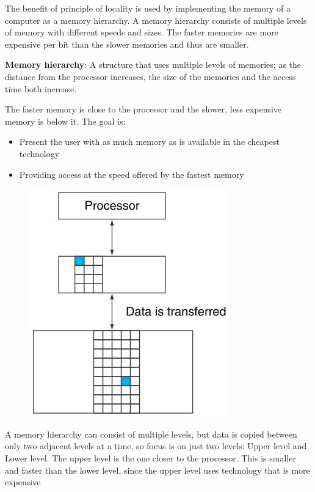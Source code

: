 \documentclass[10pt,a4paper]{article}
\begin{document}
The benefit of principle of locality is used by implementing the memory of a computer as a memory
hierarchy. A memory hierarchy consists of multiple levels of memory with different speeds and sizes.
The faster memories are more expensive per bit than the slower memories and thus are smaller.

\begin{tcolorbox}[breakable,colback=white]
\textbf{Memory hierarchy}: A structure that uses multiple levels of memories; as the distance from
the processor increases, the size of the memories and the access time both increase.
\end{tcolorbox}

The faster memory is close to the processor and the slower, less expensive memory is below it. The
goal is:
\begin{itemize}
    \item Present the user with as much memory as is available in the cheapest technology
    \item Providing access at the speed offered by the fastest memory
\end{itemize}

\pagebreak

\begin{figure} [h!]
    \centering
    \includegraphics[scale=0.7]{Hier.JPG}
\end{figure}

A memory hierarchy can consist of multiple levels, but data is copied between only two adjacent
levels at a time, so focus is on just two levels: Upper level and Lower level. The upper level is the one closer to the processor. This is smaller and faster than the lower level, since the upper level uses technology that is more expensive
\end{document}
